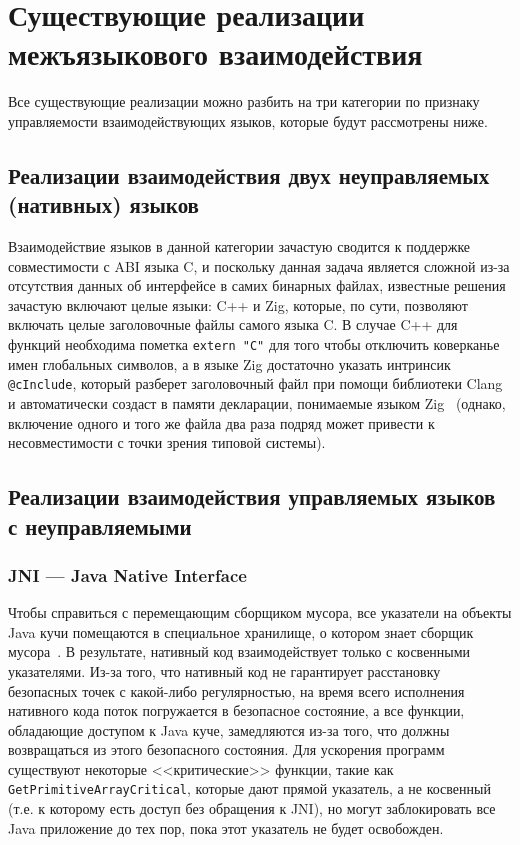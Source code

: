 \documentclass[times
]{itmo-student-thesis}
\begin{document}
\section{Существующие реализации межъязыкового взаимодействия}

Все существующие реализации можно разбить на три категории по признаку управляемости взаимодействующих языков, которые будут рассмотрены ниже.

\subsection{Реализации взаимодействия двух неуправляемых (нативных) языков}
Взаимодействие языков в данной категории зачастую сводится к поддержке совместимости с ABI языка C, и поскольку данная задача является сложной из-за отсутствия данных об интерфейсе в самих бинарных файлах, известные решения зачастую включают целые языки: C++ и Zig, которые, по сути, позволяют включать целые заголовочные файлы самого языка C. В случае C++ для функций необходима пометка \texttt{extern "C"} для того чтобы отключить коверканье имен глобальных символов, а в языке Zig достаточно указать интринсик \texttt{@cInclude}, который разберет заголовочный файл при помощи библиотеки Clang и автоматически создаст в памяти декларации, понимаемые языком Zig~\cite{zig-cinclude} (однако, включение одного и того же файла два раза подряд может привести к несовместимости с точки зрения типовой системы).

\subsection{Реализации взаимодействия управляемых языков с неуправляемыми}
\subsubsection{JNI --- Java Native Interface}
Чтобы справиться с перемещающим сборщиком мусора, все указатели на объекты Java кучи помещаются в специальное хранилище, о котором знает сборщик мусора~\cite{jni-obj-references}. В результате, нативный код взаимодействует только с косвенными указателями. Из-за того, что нативный код не гарантирует расстановку безопасных точек с какой-либо регулярностью, на время всего исполнения нативного кода поток погружается в безопасное состояние, а все функции, обладающие доступом к Java куче, замедляются из-за того, что должны возвращаться из этого безопасного состояния. Для ускорения программ существуют некоторые <<критические>> функции, такие как \texttt{GetPrimitiveArrayCritical}, которые дают прямой указатель, а не косвенный (т.е. к которому есть доступ без обращения к JNI), но могут заблокировать все Java приложение до тех пор, пока этот указатель не будет освобожден.
\end{document}
